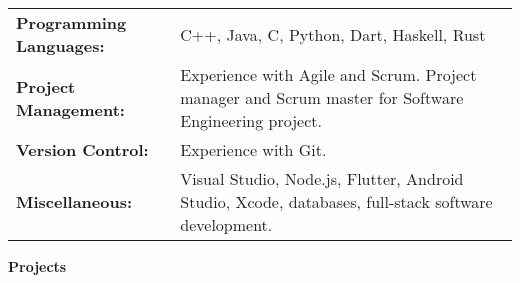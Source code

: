 \documentclass[a4paper]{article}
\newcommand{\lineunder} {
    \vspace*{-8pt} \\
    \hspace*{-18pt} \hrulefill \\
}
\newcommand{\header} [1] {
    {\hspace*{-18pt}\vspace*{6pt}\LARGE \textbf{#1}}
    \vspace*{-6pt} \lineunder
}
\begin{document}
\def\arraystretch{1.25}
\begin{tabular}{ l p{.69\linewidth} }
	\hspace*{-3.28mm} \textbf{Programming Languages:} & C++, Java, C, Python, Dart, Haskell, Rust                                                                                \\
	\hspace*{-3.28mm} \textbf{Project Management:}   & Experience with Agile and Scrum. Project manager and Scrum master for Software Engineering project. \\
	\hspace*{-3.28mm} \textbf{Version Control:}       & Experience with Git.\\
    \hspace*{-3.28mm} \textbf{Miscellaneous:}       & Visual Studio, Node.js, Flutter, Android Studio, Xcode, databases, full-stack software development.                                                                                              \\
\end{tabular}
\vspace{2mm}

\header{Projects}
\vspace{1mm}


\end{document}
